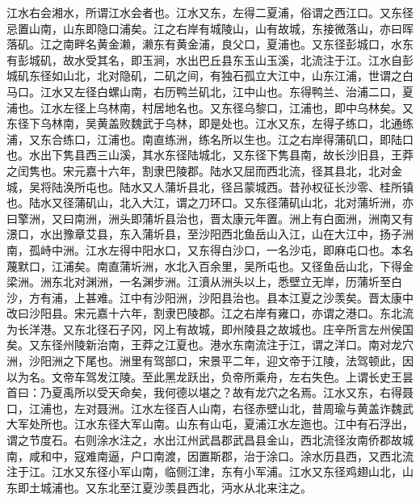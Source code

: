 \documentclass[12pt,UTF8]{ctexbook}
\begin{document}
江水右会湘水，所谓江水会者也。江水又东，左得二夏浦，俗谓之西江口。又东径忌置山南，山东即隐口浦矣。江之右岸有城陵山，山有故城，东接微落山，亦曰晖落矶。江之南畔名黄金濑，濑东有黄金浦，良父口，夏浦也。又东径彭城口，水东有彭城矶，故水受其名，即玉涧，水出巴丘县东玉山玉溪，北流注于江。江水自彭城矶东径如山北，北对隐矶，二矶之间，有独石孤立大江中，山东江浦，世谓之白马口。江水又左径白螺山南，右历鸭兰矶北，江中山也。东得鸭兰、治浦二口，夏浦也。江水左径上乌林南，村居地名也。又东径乌黎口，江浦也，即中乌林矣。又东径下乌林南，吴黄盖败魏武于乌林，即是处也。江水又东，左得子练口，北通练浦，又东合练口，江浦也。南直练洲，练名所以生也。江之右岸得蒲矶口，即陆口也。水出下隽县西三山溪，其水东径陆城北，又东径下隽县南，故长沙旧县，王莽之闰隽也。宋元嘉十六年，割隶巴陵郡。陆水又屈而西北流，径其县北，北对金城，吴将陆涣所屯也。陆水又人蒲圻县北，径吕蒙城西。昔孙权征长沙零、桂所镇也。陆水又径蒲矶山，北入大江，谓之刀环口。又东径蒲矶山北，北对蒲圻洲，亦曰擎洲，又曰南洲，洲头即蒲圻县治也，晋太康元年置。洲上有白面洲，洲南又有澋口，水出豫章艾县，东入蒲圻县，至沙阳西北鱼岳山入江，山在大江中，扬子洲南，孤峙中洲。江水左得中阳水口，又东得白沙口，一名沙屯，即麻屯口也。本名蔑默口，江浦矣。南直蒲圻洲，水北入百余里，吴所屯也。又径鱼岳山北，下得金梁洲。洲东北对渊洲，一名渊步洲。江濆从洲头以上，悉壁立无岸，历蒲圻至白沙，方有浦，上甚难。江中有沙阳洲，沙阳县治也。县本江夏之沙羡矣。晋太康中改曰沙阳县。宋元嘉十六年，割隶巴陵郡。江之右岸有雍口，亦谓之港口。东北流为长洋港。又东北径石子冈，冈上有故城，即州陵县之故城也。庄辛所言左州侯国矣。又东径州陵新治南，王莽之江夏也。港水东南流注于江，谓之洋口。南对龙穴洲，沙阳洲之下尾也。洲里有驾部口，宋景平二年，迎文帝于江陵，法驾顿此，因以为名。文帝车驾发江陵。至此黑龙跃出，负帝所乘舟，左右失色。上谓长史王昙首曰：乃夏禹所以受天命矣，我何德以堪之？故有龙穴之名焉。江水又东，右得聂口，江浦也，左对聂洲。江水左径百人山南，右径赤壁山北，昔周瑜与黄盖诈魏武大军处所也。江水东径大军山南。山东有山屯，夏浦江水左迤也。江中有石浮出，谓之节度石。右则涂水注之，水出江州武昌郡武昌县金山，西北流径汝南侨郡故城南，咸和中，寇难南逼，户口南渡，因置斯郡，治于涂口。涂水历县西，又西北流注于江。江水又东径小军山南，临侧江津，东有小军浦。江水又东径鸡翅山北，山东即土城浦也。又东北至江夏沙羡县西北，沔水从北来注之。
\end{document}
